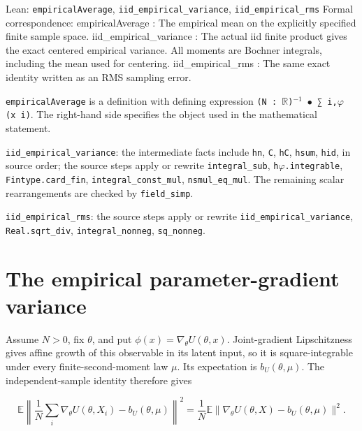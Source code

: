 \documentclass[11pt,a4paper]{article}
\begin{document}
\begin{leanbox}{Lean: \texttt{empiricalAverage}, \texttt{iid\_\allowbreak{}empirical\_\allowbreak{}variance}, \texttt{iid\_\allowbreak{}empirical\_\allowbreak{}rms}}
Formal correspondence: empiricalAverage : The empirical mean on the explicitly specified finite sample space. iid\_empirical\_variance : The actual iid finite product gives the exact centered empirical variance. All moments are Bochner integrals, including the mean used for centering. iid\_empirical\_rms : The same exact identity written as an RMS sampling error.



\texttt{empirical\allowbreak{}Average} is a definition with defining expression \texttt{(N : \ensuremath{\mathbb R})\ensuremath{{}^{-1}} \ensuremath{\bullet} ∑ i,\ensuremath{\varphi} (x i)}. The right-hand side specifies the object used in the mathematical statement.



\texttt{iid\_\allowbreak{}empirical\_\allowbreak{}variance}: the intermediate facts include \texttt{hn}, \texttt{C}, \texttt{h\allowbreak{}C}, \texttt{hsum}, \texttt{hid}, in source order; the source steps apply or rewrite \texttt{integral\_\allowbreak{}sub}, \texttt{h\ensuremath{\varphi}.\allowbreak{}integrable}, \texttt{Fintype.\allowbreak{}card\_\allowbreak{}fin}, \texttt{integral\_\allowbreak{}const\_\allowbreak{}mul}, \texttt{nsmul\_\allowbreak{}eq\_\allowbreak{}mul}. The remaining scalar rearrangements are checked by \texttt{field\_\allowbreak{}simp}.



\texttt{iid\_\allowbreak{}empirical\_\allowbreak{}rms}: the source steps apply or rewrite \texttt{iid\_\allowbreak{}empirical\_\allowbreak{}variance}, \texttt{Real.\allowbreak{}sqrt\_\allowbreak{}div}, \texttt{integral\_\allowbreak{}nonneg}, \texttt{sq\_\allowbreak{}nonneg}.
\end{leanbox}

\section{\texorpdfstring{The empirical parameter-gradient variance}{The empirical parameter-gradient variance}}


Assume \(N>0\), fix \(\theta\), and put \(\phi(x)=\nabla_\theta U(\theta,x)\). Joint-gradient Lipschitzness gives affine growth of this observable in its latent input, so it is square-integrable under every finite-second-moment law \(\mu\). Its expectation is \(b_U(\theta,\mu)\). The independent-sample identity therefore gives

\[\mathbb E\left\|\frac1N\sum_i\nabla_\theta U(\theta,X_i)-b_U(\theta,\mu)\right\|^2=\frac1N\mathbb E\|\nabla_\theta U(\theta,X)-b_U(\theta,\mu)\|^2.\]
\end{document}
